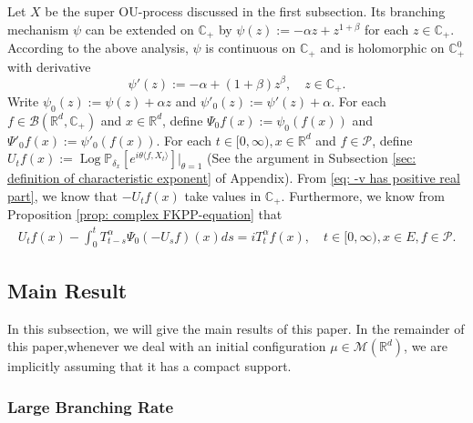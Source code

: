\documentclass[12pt,oneside,english]{amsart}
\theoremstyle{plain}
\theoremstyle{definition}
\numberwithin{equation}{section}
\begin{document}
\subsection{}
    Let $X$ be the super OU-process discussed in the first subsection.
    Its branching mechanism $\psi$ can be extended on $\mathbb C_+$ by $\psi(z) := -\alpha z + z^{1+\beta}$ for each $z\in \mathbb C_+$.
    According to the above analysis, $\psi$ is continuous on $\mathbb C_+$ and is holomorphic on $\mathbb C_+^0$ with derivative
\begin{equation}
\label{eq: deriavetive of the Poission part}
    \psi'(z) := -\alpha + (1+\beta)z^{\beta},
    \quad z\in \mathbb C_+.
\end{equation}
    Write $\psi_0(z) := \psi(z) + \alpha z$ and $\psi'_0(z) := \psi'(z) + \alpha$.
    For each $f\in \mathcal B(\mathbb R^d, \mathbb C_+)$ and $x\in \mathbb R^d$, define $\Psi_0f(x) := \psi_0(f(x))$ and $\Psi'_0 f(x) := \psi'_0(f(x))$.
    For each $t\in [0,\infty), x\in \mathbb R^d $ and $f \in \mathcal{P}$, define $U_tf(x) := \operatorname{Log} \mathbb P_{\delta_x}[e^{i\theta \langle f, X_t\rangle}]|_{\theta = 1}$
    (See the argument in Subsection \ref{sec: definition of characteristic exponent} of Appendix).
    From \eqref{eq: -v has positive real part}, we know that $-U_tf(x)$ take values in $\mathbb C_+$. Furthermore, we know from Proposition \ref{prop: complex FKPP-equation} that
\begin{align}
\label{eq:chareq2}
    U_tf(x)-\int_0^t T^{\alpha}_{t-s} \Psi_0(-U_sf)(x)ds
    =i T^{\alpha}_t f(x),
    \quad t\in [0,\infty), x\in E, f\in \mathcal P.
\end{align}

\subsection{Main Result}

In this subsection, we will give the main results of this paper. In the remainder of this paper,whenever we deal with an initial configuration $\mu \in \mathcal{M}(\mathbb{R}^d)$, we are implicitly assuming that it has a compact support.
\subsubsection{Large Branching Rate}
\end{document}

